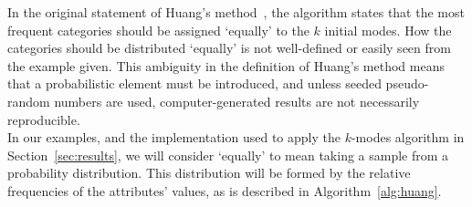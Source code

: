 In the original statement of Huang's method~\cite{Huang98}, the algorithm states
that the most frequent categories should be assigned `equally' to the \(k\) 
initial modes. How the categories should be distributed `equally' is not 
well-defined or easily seen from the example given. This ambiguity in the 
definition of Huang's method means that a probabilistic element must be 
introduced, and unless seeded pseudo-random numbers are used, computer-generated
results are not necessarily reproducible.\\

In our examples, and the implementation used to apply the \(k\)-modes algorithm
in Section~\ref{sec:results}, we will consider `equally' to mean taking a sample
from a probability distribution. This distribution will be formed by the
relative frequencies of the attributes' values, as is described in
Algorithm~\ref{alg:huang}.\\

